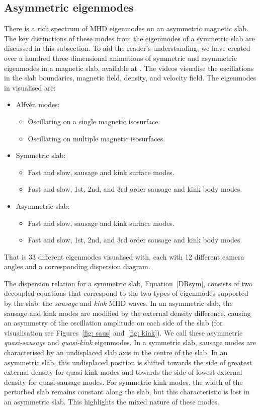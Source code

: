 \subsection{Asymmetric eigenmodes} \label{sec: asym eigenmodes}
There is a rich spectrum of MHD eigenmodes on an asymmetric magnetic slab. The key distinctions of these modes from the eigenmodes of a symmetric slab are discussed in this subsection. To aid the reader's understanding, we have created over a hundred three-dimensional animations of symmetric and asymmetric eigenmodes in a magnetic slab, available at \cite{all_etal18c}. The videos visualise the oscillations in the slab boundaries, magnetic field, density, and velocity field. The eigenmodes in visualised are:
\begin{itemize}
	\item Alfv\'{e}n modes:
	\begin{itemize}
		\item Oscillating on a single magnetic isosurface.
		\item Oscillating on multiple magnetic isosurfaces.
	\end{itemize}
	\item Symmetric slab:
	\begin{itemize}
		\item Fast and slow, sausage and kink surface modes.
		\item Fast and slow, 1st, 2nd, and 3rd order sausage and kink body modes.
	\end{itemize}
	\item Asymmetric slab:
	\begin{itemize}
		\item Fast and slow, sausage and kink surface modes.
		\item Fast and slow, 1st, 2nd, and 3rd order sausage and kink body modes.
	\end{itemize}
\end{itemize}
That is 33 different eigenmodes visualised with, each with 12 different camera angles and a corresponding dispersion diagram.

The dispersion relation for a symmetric slab, Equation~\eqref{DRsym}, consists of two decoupled equations that correspond to the two types of eigenmodes supported by the slab: the \textit{sausage} and \textit{kink} MHD waves. In an asymmetric slab, the sausage and kink modes are modified by the external density difference, causing an asymmetry of the oscillation amplitude on each side of the slab (for visualisation see Figures~\ref{fig: saus} and~\ref{fig: kink}). We call these asymmetric \textit{quasi-sausage} and \textit{quasi-kink} eigenmodes. In a symmetric slab, sausage modes are characterised by an undisplaced slab axis in the centre of the slab. In an asymmetric slab, this undisplaced position is shifted towards the side of greatest external density for quasi-kink modes and towards the side of lowest external density for quasi-sausage modes. For symmetric kink modes, the width of the perturbed slab remains constant along the slab, but this characteristic is lost in an asymmetric slab. This highlights the mixed nature of these modes.

